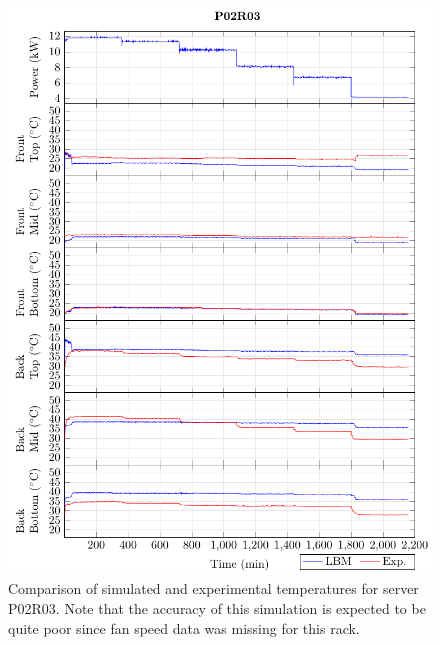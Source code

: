 \begin{figure}[!htb]
\centering
\includegraphics[width=\linewidth]{Plots/P02R03_T.pdf}
\caption{Comparison of simulated and experimental temperatures for server P02R03. Note that the accuracy of this simulation is expected to be quite poor since fan speed data was missing for this rack.}
\label{fig:P02R03_plot}
\end{figure}

\clearpage

